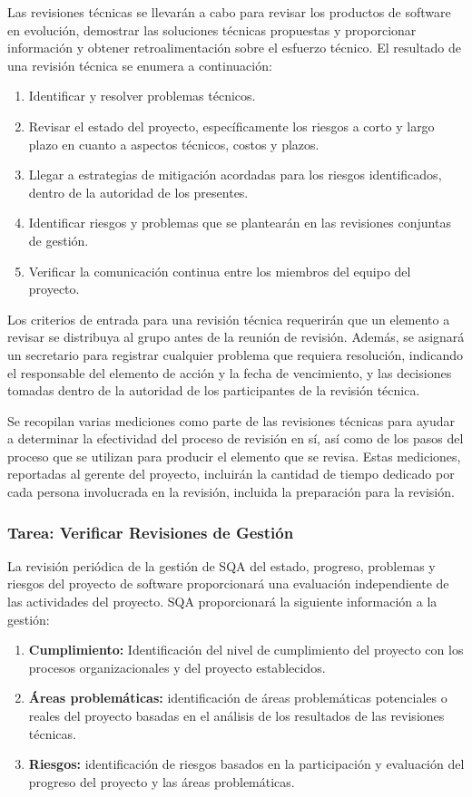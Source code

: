Las revisiones técnicas se llevarán a cabo para revisar los productos de software en evolución, demostrar las soluciones técnicas propuestas y proporcionar información y obtener retroalimentación sobre el esfuerzo técnico. El resultado de una revisión técnica se enumera a continuación:
\begin{enumerate}
    \item Identificar y resolver problemas técnicos.
    \item Revisar el estado del proyecto, específicamente los riesgos a corto y largo plazo en cuanto a aspectos técnicos, costos y plazos.
    \item Llegar a estrategias de mitigación acordadas para los riesgos identificados, dentro de la autoridad de los presentes.
    \item Identificar riesgos y problemas que se plantearán en las revisiones conjuntas de gestión.
    \item Verificar la comunicación continua entre los miembros del equipo del proyecto.
\end{enumerate}

Los criterios de entrada para una revisión técnica requerirán que un elemento a revisar se distribuya al grupo antes de la reunión de revisión. Además, se asignará un secretario para registrar cualquier problema que requiera resolución, indicando el responsable del elemento de acción y la fecha de vencimiento, y las decisiones tomadas dentro de la autoridad de los participantes de la revisión técnica.

Se recopilan varias mediciones como parte de las revisiones técnicas para ayudar a determinar la efectividad del proceso de revisión en sí, así como de los pasos del proceso que se utilizan para producir el elemento que se revisa. Estas mediciones, reportadas al gerente del proyecto, incluirán la cantidad de tiempo dedicado por cada persona involucrada en la revisión, incluida la preparación para la revisión.

\subsubsection{ Tarea: Verificar Revisiones de Gestión}
La revisión periódica de la gestión de SQA del estado, progreso, problemas y riesgos del proyecto de software proporcionará una evaluación independiente de las actividades del proyecto. SQA proporcionará la siguiente información a la gestión:
\begin{enumerate}
    \item \textbf{Cumplimiento:} Identificación del nivel de cumplimiento del proyecto con los procesos organizacionales y del proyecto establecidos.
    \item \textbf{Áreas problemáticas:} identificación de áreas problemáticas potenciales o reales del proyecto basadas en el análisis de los resultados de las revisiones técnicas.
    \item \textbf{Riesgos:} identificación de riesgos basados en la participación y evaluación del progreso del proyecto y las áreas problemáticas.
\end{enumerate}

